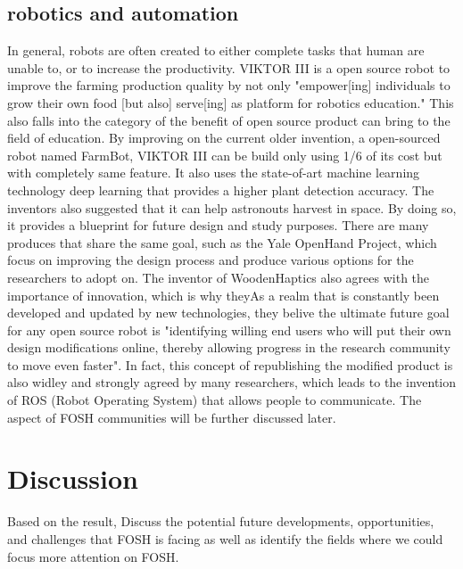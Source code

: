 \documentclass[acmtog]{acmart}
\begin{document}
\subsection{robotics and automation}
In general, robots are often created to either complete tasks that human are unable to, or to increase the productivity. VIKTOR III is a open source robot to improve the farming production quality by not only "empower[ing] individuals to grow their own food [but also] serve[ing] as platform for robotics education." This also falls into the category of the benefit of open source product can bring to the field of education. By improving on the current older invention, a open-sourced robot named FarmBot, VIKTOR III can be build only using 1/6 of its cost but with completely same feature. It also uses the state-of-art machine learning technology deep learning that provides a higher plant detection accuracy. The inventors also suggested that it can help astronouts harvest in space. By doing so, it provides a blueprint for future design and study purposes. There are many produces that share the same goal, such as the Yale OpenHand Project, which focus on improving the design process and produce various options for the researchers to adopt on.  The inventor of WoodenHaptics also agrees with the importance of innovation, which is why theyAs a realm that is constantly been developed and updated by new technologies, they belive the ultimate future goal for any open source robot is "identifying willing end users who will put their own design modifications online, thereby allowing progress in the research community to move even faster". In fact, this concept of republishing the modified product is also widley and strongly agreed by many researchers, which leads to the invention of ROS (Robot Operating System) that allows people to communicate. The aspect of FOSH communities will be further discussed later. 




\section{Discussion}
Based on the result, Discuss the potential future developments, opportunities, and challenges that FOSH is facing as well as identify the fields where we could focus more attention on FOSH.

\end{document}
